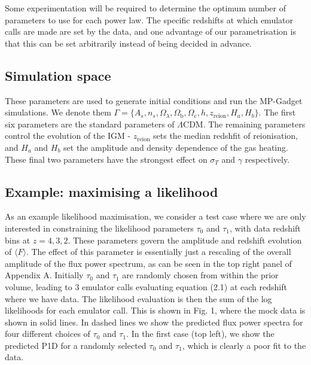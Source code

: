 \documentclass[]{article}
\begin{document}
\noindent Some experimentation will be required to determine the optimum number of 
parameters to use for each power law. The specific redshifts at which emulator calls are 
made are set by the data, and one advantage of our parametrisation is that this can be 
set arbitrarily instead of being decided in advance.

\subsection{Simulation space}
These parameters are used to generate initial conditions and run the MP-Gadget simulations.
We denote them $\Gamma=\{A_s, n_s, \Omega_\lambda, \Omega_\mathrm{b}, \Omega_\mathrm{c},h,
z_\mathrm{reion},H_a, H_b\}$. The first six parameters are the standard parameters of
$\Lambda$CDM. The remaining parameters control the evolution of the IGM -  $z_\mathrm{reion}$
sets the median redshfit of reionisation, and $H_a$ and $H_b$ set the amplitude and density
dependence of the gas heating. These final two parameters have the strongest
effect on $\sigma_T$ and $\gamma$ respectively.


\subsection{Example: maximising a likelihood}
As an example likelihood maximisation, we consider a test case where we are only interested 
in constraining the likelihood parameters $\tau_0$ and $\tau_1$, with data redshift bins 
at $z=4,3,2$. These parameters govern the amplitude and redshift evolution of $\langle F\rangle$.
The effect of this parameter is essentially just a rescaling of the overall amplitude of the flux
power spectrum, as can be seen in the top right panel of Appendix A.
Initially $\tau_0$ and $\tau_1$ are randomly chosen from within the prior 
volume, leading to 3 emulator calls evaluating equation (2.1) at each redshift where we 
have data. The likelihood evaluation is then the sum of the log likelihoods for each 
emulator call. This is shown in Fig. 1, where the mock data is shown in solid lines.
In dashed lines we show the predicted flux power spectra for four different choices of
$\tau_0$ and $\tau_1$. In the first case (top left), we show the predicted P1D for a randomly selected
$\tau_0$ and $\tau_1$, which is clearly a poor fit to the data.
\end{document}
